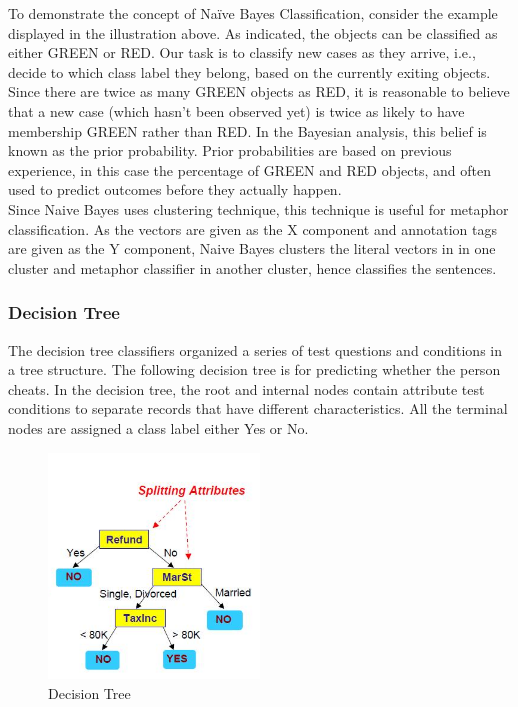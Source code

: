 \documentclass[a4paper]{article}
\begin{document}
To demonstrate the concept of Naïve Bayes Classification, consider the example displayed in the illustration above. As indicated, the objects can be classified as either GREEN or RED. Our task is to classify new cases as they arrive, i.e., decide to which class label they belong, based on the currently exiting objects.
\\
Since there are twice as many GREEN objects as RED, it is reasonable to believe that a new case (which hasn't been observed yet) is twice as likely to have membership GREEN rather than RED. In the Bayesian analysis, this belief is known as the prior probability. Prior probabilities are based on previous experience, in this case the percentage of GREEN and RED objects, and often used to predict outcomes before they actually happen.
\\
Since Naive Bayes uses clustering technique, this technique is useful for metaphor classification. As the vectors are given as the X component and annotation tags are given as the Y component, Naive Bayes clusters the literal vectors in in one cluster and metaphor classifier in another cluster, hence classifies the sentences.


\subsubsection{Decision Tree}
The decision tree classifiers organized a series of test questions and conditions in a tree structure. The following decision tree is for predicting whether the person cheats. In the decision tree, the root and internal nodes contain attribute test conditions to separate records that have different characteristics. All the terminal nodes are assigned a class label either Yes or No.
\begin{figure}[h!]
  \centering
  \includegraphics[width=0.5\textwidth]{DecisionTree}
  \caption{Decision Tree}
\end{figure}
\end{document}
